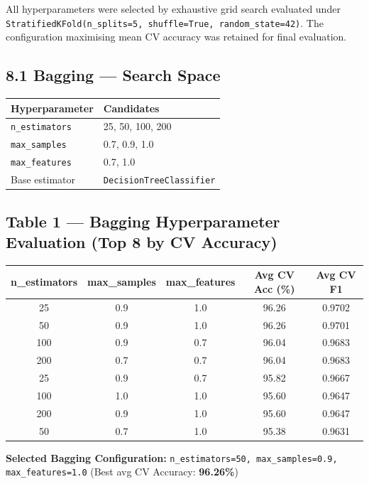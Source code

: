 \documentclass[12pt,a4paper]{article}
\begin{document}
All hyperparameters were selected by exhaustive grid search evaluated under
\texttt{StratifiedKFold(n\_splits=5, shuffle=True, random\_state=42)}.
The configuration maximising mean CV accuracy was retained for final evaluation.

\subsection*{8.1 Bagging — Search Space}

\begin{center}
\begin{tabular}{ll}
\toprule
\textbf{Hyperparameter} & \textbf{Candidates} \\
\midrule
\texttt{n\_estimators}   & 25, 50, 100, 200 \\
\texttt{max\_samples}    & 0.7, 0.9, 1.0 \\
\texttt{max\_features}   & 0.7, 1.0 \\
Base estimator           & \texttt{DecisionTreeClassifier} \\
\bottomrule
\end{tabular}
\end{center}

\subsection*{Table 1 — Bagging Hyperparameter Evaluation (Top 8 by CV Accuracy)}

\begin{center}
\begin{tabular}{ccccc}
\toprule
\textbf{n\_estimators} & \textbf{max\_samples} & \textbf{max\_features}
  & \textbf{Avg CV Acc (\%)} & \textbf{Avg CV F1} \\
\midrule
25  & 0.9 & 1.0 & 96.26 & 0.9702 \\
50  & 0.9 & 1.0 & 96.26 & 0.9701 \\
100 & 0.9 & 0.7 & 96.04 & 0.9683 \\
200 & 0.7 & 0.7 & 96.04 & 0.9683 \\
25  & 0.9 & 0.7 & 95.82 & 0.9667 \\
100 & 1.0 & 1.0 & 95.60 & 0.9647 \\
200 & 0.9 & 1.0 & 95.60 & 0.9647 \\
50  & 0.7 & 1.0 & 95.38 & 0.9631 \\
\bottomrule
\end{tabular}
\end{center}

\textbf{Selected Bagging Configuration:}
\texttt{n\_estimators=50, max\_samples=0.9, max\_features=1.0}
(Best avg CV Accuracy: \textbf{96.26\%})
\end{document}
